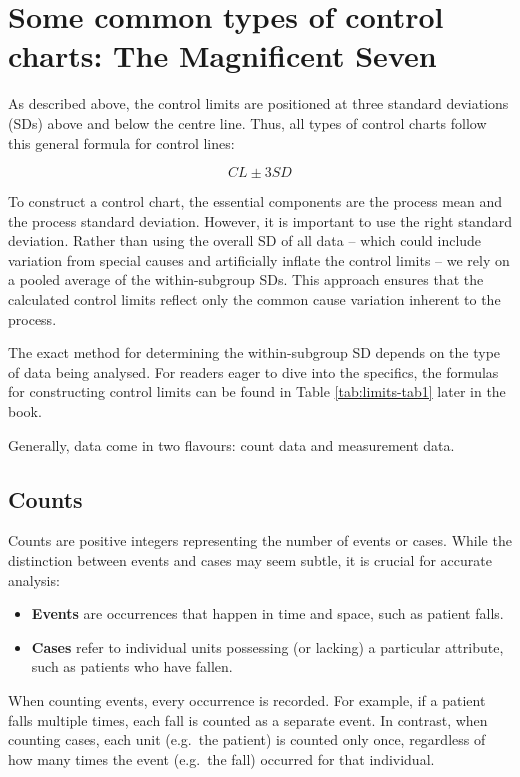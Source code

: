 \documentclass[
]{book}
\begin{document}
\section{Some common types of control charts: The Magnificent Seven}\label{some-common-types-of-control-charts-the-magnificent-seven}

As described above, the control limits are positioned at three standard deviations (SDs) above and below the centre line. Thus, all types of control charts follow this general formula for control lines:

\[CL \pm 3SD\]

To construct a control chart, the essential components are the process mean and the process standard deviation. However, it is important to use the right standard deviation. Rather than using the overall SD of all data -- which could include variation from special causes and artificially inflate the control limits -- we rely on a pooled average of the within-subgroup SDs. This approach ensures that the calculated control limits reflect only the common cause variation inherent to the process.

The exact method for determining the within-subgroup SD depends on the type of data being analysed. For readers eager to dive into the specifics, the formulas for constructing control limits can be found in Table \ref{tab:limits-tab1} later in the book.

Generally, data come in two flavours: count data and measurement data.

\subsection{Counts}\label{counts}

Counts are positive integers representing the number of events or cases. While the distinction between events and cases may seem subtle, it is crucial for accurate analysis:

\begin{itemize}
\item
  \textbf{Events} are occurrences that happen in time and space, such as patient falls.
\item
  \textbf{Cases} refer to individual units possessing (or lacking) a particular attribute, such as patients who have fallen.
\end{itemize}

When counting events, every occurrence is recorded. For example, if a patient falls multiple times, each fall is counted as a separate event. In contrast, when counting cases, each unit (e.g.~the patient) is counted only once, regardless of how many times the event (e.g.~the fall) occurred for that individual.
\end{document}

